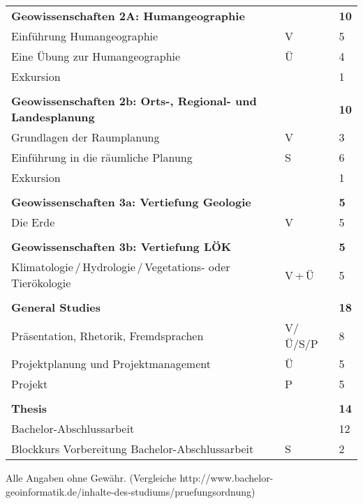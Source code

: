 \begin{longtable}{p{} p{} p{}}
\textbf{Geowissenschaften 2A: Humangeographie} & & \textbf{10}\\
Einführung Humangeographie & V & 5\\
Eine Übung zur Humangeographie & Ü & 4\\
Exkursion & & 1\\
&&\\
\textbf{Geowissenschaften 2b: Orts-, Regional- und Landesplanung} & & \textbf{10}\\
Grundlagen der Raumplanung & V & 3\\
Einführung in die räumliche Planung & S & 6\\
Exkursion & & 1\\
&&\\
\textbf{Geowissenschaften 3a: Vertiefung Geologie} & & \textbf{5}\\
Die Erde & V & 5\\
&&\\
\textbf{Geowissenschaften 3b: Vertiefung LÖK} & & \textbf{5}\\
Klimatologie\,/\,Hydrologie\,/\,Vegetations- oder Tierökologie& V\,+\,Ü & 5\\
&&\\
\textbf{General Studies} & & \textbf{18}\\
Präsentation, Rhetorik, Fremdsprachen & V/Ü/S/P & 8\\
Projektplanung und Projektmanagement & Ü & 5\\
Projekt & P & 5\\
&&\\
\textbf{Thesis} & & \textbf{14}\\
Bachelor-Abschlussarbeit & & 12\\
Blockkurs Vorbereitung Bachelor-Abschlussarbeit & S & 2\\

\end{longtable}

Alle Angaben ohne Gewähr. (Vergleiche http://www.bachelor-geoinformatik.de/inhalte-des-studiums/pruefungsordnung)

\newpage


